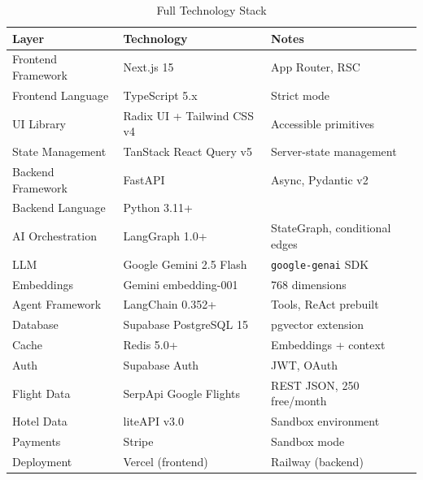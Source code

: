 \documentclass[12pt, a4paper]{article}
\begin{document}
\begin{table}[H]
\centering
\renewcommand{\arraystretch}{1.35}
\begin{tabularx}{\textwidth}{|l|l|X|}
  \hline
  \textbf{Layer} & \textbf{Technology} & \textbf{Notes} \\
  \hline
  Frontend Framework     & Next.js 15                  & App Router, RSC \\
  \hline
  Frontend Language      & TypeScript 5.x              & Strict mode \\
  \hline
  UI Library             & Radix UI + Tailwind CSS v4  & Accessible primitives \\
  \hline
  State Management       & TanStack React Query v5     & Server-state management \\
  \hline
  Backend Framework      & FastAPI                     & Async, Pydantic v2 \\
  \hline
  Backend Language       & Python 3.11+                & \\
  \hline
  AI Orchestration       & LangGraph 1.0+              & StateGraph, conditional edges \\
  \hline
  LLM                    & Google Gemini 2.5 Flash     & \texttt{google-genai} SDK \\
  \hline
  Embeddings             & Gemini embedding-001        & 768 dimensions \\
  \hline
  Agent Framework        & LangChain 0.352+            & Tools, ReAct prebuilt \\
  \hline
  Database               & Supabase PostgreSQL 15      & pgvector extension \\
  \hline
  Cache                  & Redis 5.0+                  & Embeddings + context \\
  \hline
  Auth                   & Supabase Auth               & JWT, OAuth \\
  \hline
  Flight Data            & SerpApi Google Flights      & REST JSON, 250 free/month \\
  \hline
  Hotel Data             & liteAPI v3.0                & Sandbox environment \\
  \hline
  Payments               & Stripe                      & Sandbox mode \\
  \hline
  Deployment             & Vercel (frontend)           & Railway (backend) \\
  \hline
\end{tabularx}
\caption{Full Technology Stack}
\end{table}
\end{document}
